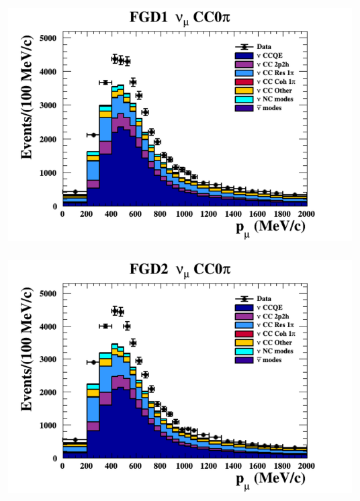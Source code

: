\begin{figure}[h]
  \begin{subfigure}[t]{0.49\textwidth}
    \includegraphics[width=\textwidth, trim={0mm 0mm 0mm 0mm}, clip,page=1]{Figures/Selections/Pmu_1D_modes_FGD1_numuCC_0pi_Data_prefit.pdf}
  \end{subfigure}%
  \begin{subfigure}[t]{0.49\textwidth}
    \includegraphics[width=\textwidth, trim={0mm 0mm 0mm 0mm}, clip,page=1]{Figures/Selections/Pmu_1D_modes_FGD2_numuCC_0pi_Data_prefit.pdf}
  \end{subfigure}
  \begin{subfigure}[t]{0.49\textwidth}

\end{subfigure}
\end{figure}
